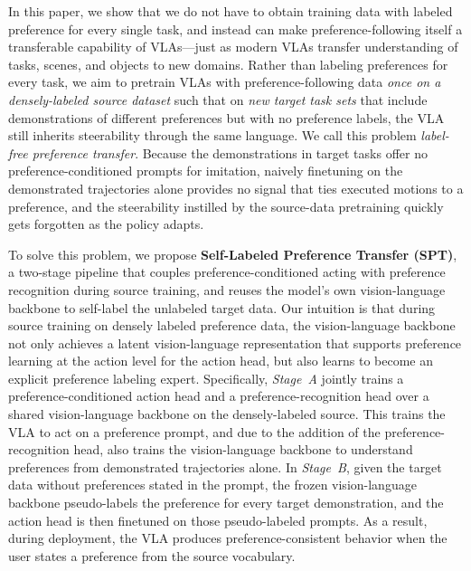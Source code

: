 \documentclass{article}
\begin{document}
In this paper, we show that we do not have to obtain training data with labeled preference for every single task, and instead can make preference-following itself a transferable capability of VLAs---just as modern VLAs transfer understanding of tasks, scenes, and objects to new domains. Rather than labeling preferences for every task, we aim to pretrain VLAs with preference-following data \emph{once on a densely-labeled source dataset} such that on \emph{new target task sets} that include demonstrations of different preferences but with no preference labels, the VLA still inherits steerability through the same language. We call this problem \emph{label-free preference transfer}. Because the demonstrations in target tasks offer no preference-conditioned prompts for imitation, naively finetuning on the demonstrated trajectories alone provides no signal that ties executed motions to a preference, and the steerability instilled by the source-data pretraining quickly gets forgotten as the policy adapts.


To solve this problem, we propose \textbf{Self-Labeled Preference Transfer (SPT)}, a two-stage pipeline that couples preference-conditioned acting with preference recognition during source training, and reuses the model's own vision-language backbone to self-label the unlabeled target data. Our intuition is that during source training on densely labeled preference data, the vision-language backbone not only achieves a latent vision-language representation that supports preference learning at the action level for the action head, but also learns to become an explicit preference labeling expert. Specifically, \emph{Stage~A} jointly trains a preference-conditioned action head and a preference-recognition head over a shared vision-language backbone on the densely-labeled source. This trains the VLA to act on a preference prompt, and due to the addition of the preference-recognition head, also trains the vision-language backbone to understand preferences from demonstrated trajectories alone. In \emph{Stage~B}, given the target data without preferences stated in the prompt, the frozen vision-language backbone pseudo-labels the preference for every target demonstration, and the action head is then finetuned on those pseudo-labeled prompts. As a result, during deployment, the VLA produces preference-consistent behavior when the user states a preference from the source vocabulary.
\end{document}
